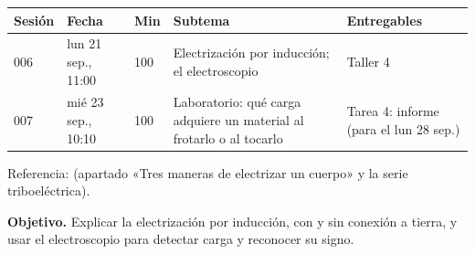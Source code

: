 \documentclass[11pt]{article}
\begin{document}
\encabezado*

\begin{center}
{\renewcommand{\arraystretch}{1.3}
\begin{tabularx}{\linewidth}{@{}l l l X l@{}}
  \toprule
  \textbf{Sesión} & \textbf{Fecha} & \textbf{Min} & \textbf{Subtema} & \textbf{Entregables}\\
  \midrule
  006 & lun 21 sep., 11:00 & 100 & Electrización por inducción; el electroscopio & Taller 4\\
  007 & mié 23 sep., 10:10 & 100 & Laboratorio: qué carga adquiere un material al frotarlo o al tocarlo & Tarea 4: informe (para el lun 28 sep.)\\
  \bottomrule
\end{tabularx}}
\end{center}

Referencia:  (apartado «Tres maneras de electrizar un cuerpo» y la serie
triboeléctrica).


\textbf{Objetivo.} Explicar la electrización por inducción, con y sin conexión a tierra, y
usar el electroscopio para detectar carga y reconocer su signo.
\end{document}
